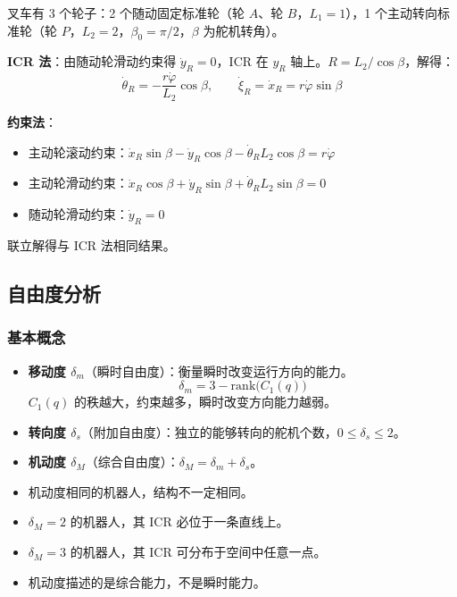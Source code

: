 \documentclass[11pt,a4paper]{article}
\begin{document}
\begin{example}
叉车有 3 个轮子：2 个随动固定标准轮（轮 $A$、轮 $B$，$L_1=1$），1 个主动转向标准轮（轮 $P$，$L_2=2$，$\beta_0=\pi/2$，$\beta$ 为舵机转角）。

\textbf{ICR 法}：由随动轮滑动约束得 $\dot{y}_R=0$，ICR 在 $y_R$ 轴上。$R=L_2/\cos\beta$，解得：
\[
\dot{\theta}_R=-\frac{r\dot{\varphi}}{L_2}\cos\beta,\qquad
\dot{\xi}_R=\dot{x}_R=r\dot{\varphi}\sin\beta
\]

\textbf{约束法}：
\begin{itemize}
  \item 主动轮滚动约束：$\dot{x}_R\sin\beta-\dot{y}_R\cos\beta-\dot{\theta}_R L_2\cos\beta=r\dot{\varphi}$
  \item 主动轮滑动约束：$\dot{x}_R\cos\beta+\dot{y}_R\sin\beta+\dot{\theta}_R L_2\sin\beta=0$
  \item 随动轮滑动约束：$\dot{y}_R=0$
\end{itemize}
联立解得与 ICR 法相同结果。
\end{example}

\subsection{自由度分析}

\subsubsection{基本概念}
\begin{itemize}
  \item \textbf{移动度 $\delta_m$}（瞬时自由度）：衡量瞬时改变运行方向的能力。
  \[
  \delta_m = 3 - \mathrm{rank}\bigl(C_1(q)\bigr)
  \]
  $C_1(q)$ 的秩越大，约束越多，瞬时改变方向能力越弱。
  \item \textbf{转向度 $\delta_s$}（附加自由度）：独立的能够转向的舵机个数，$0\le\delta_s\le 2$。
  \item \textbf{机动度 $\delta_M$}（综合自由度）：$\delta_M=\delta_m+\delta_s$。
\end{itemize}

\begin{notebox}
\begin{itemize}
  \item 机动度相同的机器人，结构不一定相同。
  \item $\delta_M=2$ 的机器人，其 ICR 必位于一条直线上。
  \item $\delta_M=3$ 的机器人，其 ICR 可分布于空间中任意一点。
  \item 机动度描述的是综合能力，不是瞬时能力。
\end{itemize}
\end{notebox}
\end{document}
